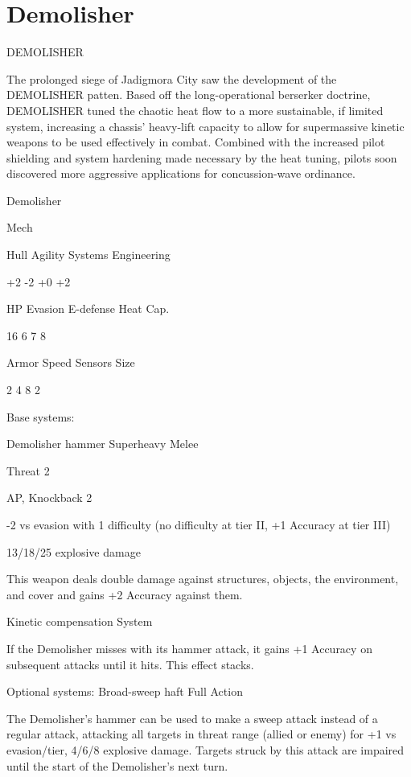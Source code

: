 \section{Demolisher}

                                            DEMOLISHER  

The prolonged siege of Jadigmora City saw the development of the DEMOLISHER patten. Based  
off the long-operational berserker doctrine, DEMOLISHER tuned the chaotic heat flow to a more  
sustainable, if limited system, increasing a chassis’ heavy-lift capacity to allow for supermassive  
kinetic weapons to be used effectively in combat. Combined with the increased pilot shielding  
and system hardening made necessary by the heat tuning, pilots soon discovered more  
aggressive applications for concussion-wave ordinance. 
 

 Demolisher 

 Mech 

 Hull       Agility      Systems       Engineering 

 +2         -2           +0            +2 

 HP         Evasion      E-defense     Heat Cap. 

 16         6            7             8 

 Armor      Speed        Sensors       Size 

 2          4            8             2 

Base systems:
 
Demolisher hammer  
Superheavy Melee
 
Threat 2
 
AP, Knockback 2
 
-2 vs evasion with 1 difficulty (no difficulty at tier II, +1 Accuracy at tier III)
 
13/18/25 explosive damage
 
This weapon deals double damage against structures, objects, the environment, and cover and  
gains +2 Accuracy against them.
 

Kinetic compensation  
System
 
If the Demolisher misses with its hammer attack, it gains +1 Accuracy on subsequent attacks  
until it hits. This effect stacks.
 

Optional systems:  
Broad-sweep haft  
Full Action
 
The Demolisher’s hammer can be used to make a sweep attack instead of a regular attack,  
attacking all targets in threat range (allied or enemy) for +1 vs evasion/tier, 4/6/8 explosive  
damage. Targets struck by this attack are impaired until the start of the Demolisher’s next turn.
 

